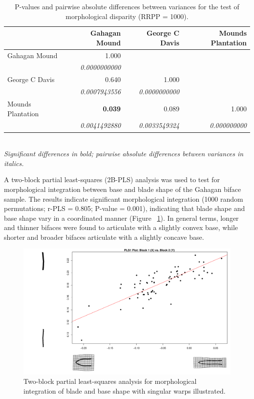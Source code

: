 \documentclass[review]{elsarticle}
\begin{document}
\begin{table}[htbp]\centering
\footnotesize
\caption{P-values and pairwise absolute differences between variances for the test of morphological disparity (RRPP = 1000).}
\centering
\begin{tabular}{lrrr}
\toprule
 & Gahagan Mound & George C Davis & Mounds Plantation\\
\midrule
Gahagan Mound & 1.000 &  &\\
 & \textit{0.0000000000} &  & \\
George C Davis & 0.640 & 1.000 & \\
 & \textit{0.0007943556} & \textit{0.0000000000} & \\
Mounds Plantation & \textbf{0.039} & 0.089 & 1.000\\
 & \textit{0.0041492880} & \textit{0.0033549324} & \textit{0.000000000}\\
\bottomrule
\end{tabular}
\bigskip\\
\textit{Significant differences in bold; pairwise absolute differences between variances in italics.}
\label{tab:Tbl4x}
\end{table}

A two-block partial least-squares (2B-PLS) analysis was used to test for morphological integration between base and blade shape of the Gahagan biface sample. The results indicate significant morphological integration (1000 random permutations; r-PLS = 0.805; P-value = 0.001), indicating that blade shape and base shape vary in a coordinated manner (Figure ~\ref{fig:FigMorphInteg}). In general terms, longer and thinner bifaces were found to articulate with a slightly convex base, while shorter and broader bifaces articulate with a slightly concave base.

\begin{figure}[htbp]\centering
\includegraphics[width=\linewidth]{gahagan-morphinteg}
\caption{Two-block partial least-squares analysis for morphological integration of blade and base shape with singular warps illustrated.}
\label{fig:FigMorphInteg}
\end{figure}
\end{document}
